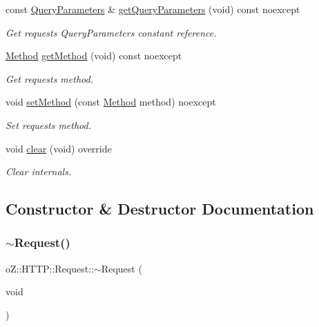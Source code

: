 \begin{DoxyCompactItemize}
const \mbox{\hyperlink{namespaceo_z_1_1_h_t_t_p_adf31e2c29997ec6637f36d62ab8944d6}{Query\+Parameters}} \& \mbox{\hyperlink{classo_z_1_1_h_t_t_p_1_1_request_a0b3375eaf3e24509f63776847ce6b784}{get\+Query\+Parameters}} (void) const noexcept
\begin{DoxyCompactList}\small\item\em Get request\textquotesingle{}s Query\+Parameters constant reference. \end{DoxyCompactList}\item 
\mbox{\hyperlink{namespaceo_z_1_1_h_t_t_p_a02d8497e4abbb0adf3af0fe9fad1b7a6}{Method}} \mbox{\hyperlink{classo_z_1_1_h_t_t_p_1_1_request_ab8c06f60e7d3b17c2ad03c7b9cb046d7}{get\+Method}} (void) const noexcept
\begin{DoxyCompactList}\small\item\em Get request\textquotesingle{}s method. \end{DoxyCompactList}\item 
void \mbox{\hyperlink{classo_z_1_1_h_t_t_p_1_1_request_ad38f30d48f4d3f201380ac1e73b26fc8}{set\+Method}} (const \mbox{\hyperlink{namespaceo_z_1_1_h_t_t_p_a02d8497e4abbb0adf3af0fe9fad1b7a6}{Method}} method) noexcept
\begin{DoxyCompactList}\small\item\em Set request\textquotesingle{}s method. \end{DoxyCompactList}\item 
void \mbox{\hyperlink{classo_z_1_1_h_t_t_p_1_1_request_ac6611fadb3515ab2667ee96b8d93ef1d}{clear}} (void) override
\begin{DoxyCompactList}\small\item\em Clear internals. \end{DoxyCompactList}\end{DoxyCompactItemize}


\subsection{Constructor \& Destructor Documentation}
\mbox{\label{classo_z_1_1_h_t_t_p_1_1_request_a2bc2913d79ffe8ce63a19c480b9cf330}} 
\subsubsection{\texorpdfstring{$\sim$Request()}{~Request()}}
{\footnotesize\ttfamily o\+Z\+::\+H\+T\+T\+P\+::\+Request\+::$\sim$\+Request (\begin{DoxyParamCaption}\item[{void}]{ }\end{DoxyParamCaption})\hspace{0.3cm}{\ttfamily [default]}}



